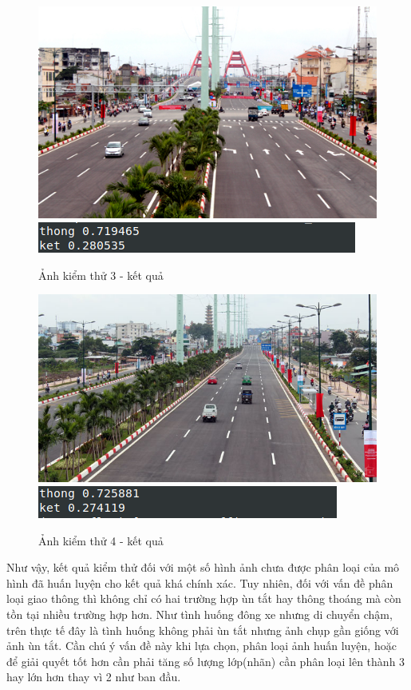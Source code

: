 	\begin{figure}[h!]
		\centering
		\includegraphics[scale=0.7]{charts/test1.jpg}
		\includegraphics[scale=0.5]{charts/res_test1.png}
		\caption{Ảnh kiểm thử 3 - kết quả}
		\label{fig:test3}
	\end{figure}
	
	\begin{figure}[h!]
		\centering
		\includegraphics[scale=0.5]{charts/test3.jpg}
		\includegraphics[scale=0.5]{charts/res_test3.png}
		\caption{Ảnh kiểm thử 4 - kết quả}
		\label{fig:test4}
	\end{figure}
	\pagebreak
	Như vậy, kết quả kiểm thử đối với một số hình ảnh chưa được phân loại của mô hình đã huấn luyện cho kết quả khá chính xác. Tuy nhiên, đối với vấn đề  phân loại giao thông thì không chỉ có hai trường hợp ùn tắt hay thông thoáng mà còn tồn tại nhiều trường hợp hơn. Như tình huống đông xe nhưng di chuyển chậm, trên thực tế đây là tình huống không phải ùn tắt nhưng ảnh chụp gần giống với ảnh ùn tắt. Cần chú ý vấn đề này khi lựa chọn, phân loại ảnh huấn luyện, hoặc để giải quyết tốt hơn cần phải tăng số lượng lớp(nhãn) cần phân loại lên thành 3 hay lớn hơn thay vì 2 như ban đầu.
	
	
	